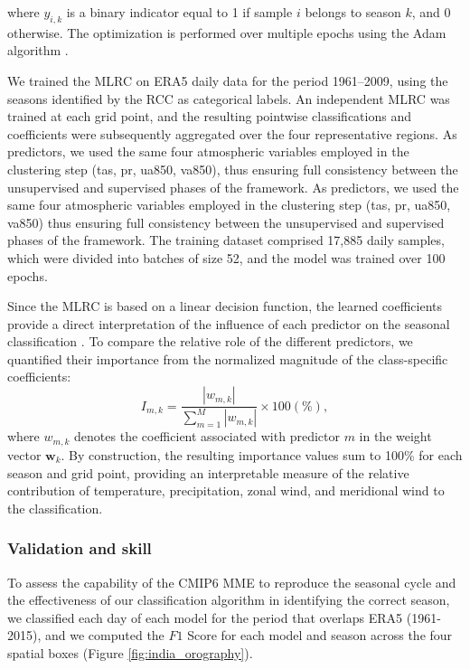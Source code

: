 where $y_{i,k}$ is a binary indicator equal to 1 if sample $i$ belongs to season $k$, and 0 otherwise. 
The optimization is performed over multiple epochs using the Adam algorithm \citep{kingma_adam_2017}.

We trained the MLRC on ERA5 daily data for the period 1961--2009, using the seasons identified by the RCC as categorical labels. An independent MLRC was trained at each grid point, and the resulting pointwise classifications and coefficients were subsequently aggregated over the four representative regions. As predictors, we used the same four atmospheric variables employed in the clustering step (tas, pr, ua850, va850), thus ensuring full consistency between the unsupervised and supervised phases of the framework.
As predictors, we used the same four atmospheric variables employed in the clustering step (tas, pr, ua850, va850) thus ensuring full consistency between the unsupervised and supervised phases of the framework.
The training dataset comprised 17,885 daily samples, which were divided into batches of size 52, and the model was trained over 100 epochs.

Since the MLRC is based on a linear decision function, the learned coefficients provide a direct interpretation of the influence of each predictor on the seasonal classification \cite{hastie_elements_2009}. To compare the relative role of the different predictors, we quantified their importance from the normalized magnitude of the class-specific coefficients:
\begin{equation}
I_{m,k} =
\frac{|w_{m,k}|}
{\sum_{m=1}^{M}|w_{m,k}|}
\times 100 (\%),
\end{equation}
where $w_{m,k}$ denotes the coefficient associated with predictor $m$ in the weight vector $\mathbf{w}_k$. By construction, the resulting importance values sum to 100\% for each season and grid point, providing an interpretable measure of the relative contribution of temperature, precipitation, zonal wind, and meridional wind to the classification.

\subsubsection{Validation and skill}

To assess the capability of the CMIP6 MME to reproduce the seasonal cycle and the effectiveness of our classification algorithm in identifying the correct season, we classified each day of each model for the period that overlaps ERA5 (1961-2015), and we computed the $F1$ Score \cite{blair_information_1979} for each model and season across the four spatial boxes (Figure \ref{fig:india_orography}). 

